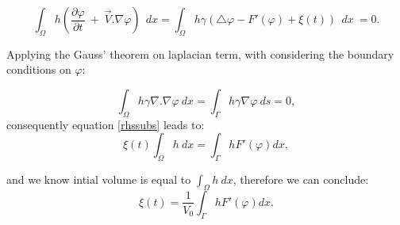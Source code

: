 \documentclass[letterpaper,10pt]{article}
\begin{document}
\begin{equation}
	\label{rhssubs}
	\int_\Omega h (\frac{\partial \varphi}{\partial t} \  + \
	\overrightarrow{V}.\nabla \varphi) \ \ dx = 
	\int_\Omega h \gamma (\bigtriangleup \varphi -F'(\varphi)+\xi(t))  \ \ dx \ = 0 .
\end{equation}

Applying the Gauss' theorem on laplacian term, with considering the boundary conditions on $\varphi$:

\begin{equation}
	\label{lapbound}
	\int_\Omega h \gamma  \nabla. \nabla \varphi \ dx = 
	\int_\Gamma h \gamma \nabla \varphi \ ds = 0,
\end{equation}
consequently equation \eqref{rhssubs} leads to:
\begin{equation}
	\label{xitcon}
	\xi(t)  \int_\Omega h  \ dx = 
	\int_\Gamma h F'(\varphi) dx, 
\end{equation}


and we know intial volume is equal to $\int_\Omega h  \ dx $, therefore we can conclude:
\begin{equation}
	\label{finalxi}
	\xi(t)  = \frac{1}{V_0} \int_\Gamma h F'(\varphi) dx. 
\end{equation}

 


\end{document}
